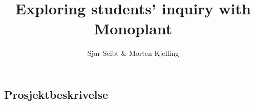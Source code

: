 \documentclass[a4paper, 12pt, english]{report}
\title{Exploring students' inquiry with Monoplant}
\author{Sjur Seibt \& Morten Kjelling}
\begin{document}
% 
% 

% 
% 
% 
% 
%
% 
 
% 





\newpage
\begin{appendices}



\chapter{Prosjektbeskrivelse}

\label{prosjektbeskrivelse}
\newpage

\end{appendices}
\end{document}
